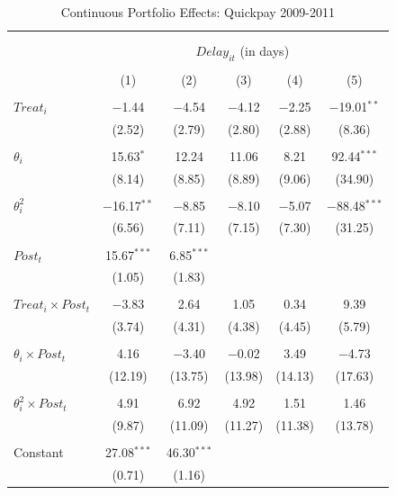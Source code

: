 \documentclass[
]{article}
\begin{document}
\begin{table}[H] \centering 
  \caption{Continuous Portfolio Effects: Quickpay 2009-2011} 
  \label{} 
\small 
\begin{tabular}{@{\extracolsep{-2pt}}lccccc} 
\\[-1.8ex]\hline 
\hline \\[-1.8ex] 
\\[-1.8ex] & \multicolumn{5}{c}{$Delay_{it}$ (in days)} \\ 
\\[-1.8ex] & (1) & (2) & (3) & (4) & (5)\\ 
\hline \\[-1.8ex] 
 $Treat_i$ & $-$1.44 & $-$4.54 & $-$4.12 & $-$2.25 & $-$19.01$^{**}$ \\ 
  & (2.52) & (2.79) & (2.80) & (2.88) & (8.36) \\ 
  & & & & & \\ 
 $\theta_i$ & 15.63$^{*}$ & 12.24 & 11.06 & 8.21 & 92.44$^{***}$ \\ 
  & (8.14) & (8.85) & (8.89) & (9.06) & (34.90) \\ 
  & & & & & \\ 
 $\theta_i^2$ & $-$16.17$^{**}$ & $-$8.85 & $-$8.10 & $-$5.07 & $-$88.48$^{***}$ \\ 
  & (6.56) & (7.11) & (7.15) & (7.30) & (31.25) \\ 
  & & & & & \\ 
 $Post_t$ & 15.67$^{***}$ & 6.85$^{***}$ &  &  &  \\ 
  & (1.05) & (1.83) &  &  &  \\ 
  & & & & & \\ 
 $Treat_i \times Post_t$ & $-$3.83 & 2.64 & 1.05 & 0.34 & 9.39 \\ 
  & (3.74) & (4.31) & (4.38) & (4.45) & (5.79) \\ 
  & & & & & \\ 
 $\theta_i \times Post_t$ & 4.16 & $-$3.40 & $-$0.02 & 3.49 & $-$4.73 \\ 
  & (12.19) & (13.75) & (13.98) & (14.13) & (17.63) \\ 
  & & & & & \\ 
 $\theta_i^2 \times Post_t$ & 4.91 & 6.92 & 4.92 & 1.51 & 1.46 \\ 
  & (9.87) & (11.09) & (11.27) & (11.38) & (13.78) \\ 
  & & & & & \\ 
 Constant & 27.08$^{***}$ & 46.30$^{***}$ &  &  &  \\ 
  & (0.71) & (1.16) &  &  &  \\ 

\end{tabular}
\end{table}
\end{document}
